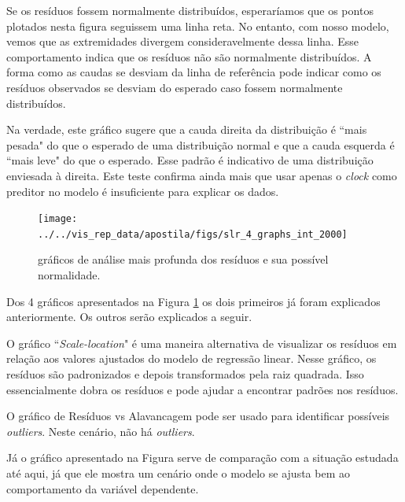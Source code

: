 \documentclass[article]{memoir}
\begin{document}
{Se os resíduos fossem normalmente distribuídos, esperaríamos que os pontos plotados nesta figura seguissem uma linha reta. No entanto, com nosso modelo, vemos que as extremidades divergem consideravelmente dessa linha. Esse comportamento indica que os resíduos não são normalmente distribuídos. A forma como as caudas se desviam da linha de referência pode indicar como os resíduos observados se desviam do esperado caso fossem normalmente distribuídos.

Na verdade, este gráfico sugere que a cauda direita da distribuição é ``mais pesada" do que o esperado de uma distribuição normal e que a cauda esquerda é ``mais leve" do que o esperado. Esse padrão é indicativo de uma distribuição enviesada à direita. Este teste confirma ainda mais que usar apenas o \textit{clock} como preditor no modelo é insuficiente para explicar os dados.



\begin{figure}[ht]
	\centering
	\texttt{[image: ../../vis\_rep\_data/apostila/figs/slr\_4\_graphs\_int\_2000]}
	\caption{gráficos de análise mais profunda dos  resíduos e sua possível normalidade.}
	\label{fig:slr4graphsint2000}
\end{figure}

Dos 4 gráficos apresentados na Figura 	\ref{fig:slr4graphsint2000} os dois primeiros já foram explicados anteriormente.  Os outros serão explicados a seguir.

O gráfico ``\textit{Scale-location}" é uma maneira alternativa de visualizar os resíduos em relação aos valores ajustados do modelo de regressão linear. Nesse gráfico, os resíduos são padronizados e depois transformados pela raiz quadrada. Isso essencialmente dobra os resíduos e pode ajudar a encontrar padrões nos resíduos. 

O gráfico de Resíduos vs Alavancagem pode ser usado para identificar possíveis \textit{outliers}. Neste cenário, não há \textit{outliers}.  

Já o gráfico apresentado na Figura 	\label{fig:duas_figuras} serve de comparação com a situação estudada até aqui, já que ele mostra um cenário onde o modelo se ajusta bem ao comportamento da variável dependente.

}
\end{document}
